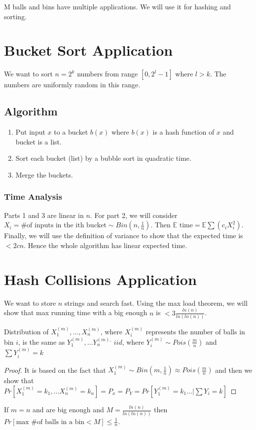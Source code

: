 M balls and bins have multiple applications. We will use it for hashing and sorting.

\section{Bucket Sort Application}

We want to sort $n = 2^k$ numbers from range $[0, 2^l-1]$ where $l > k$. The numbers are uniformly random in this range.

\subsection{Algorithm}

\begin{enumerate}
	\item Put input $x$ to a bucket $b(x)$ where $b(x)$ is a hash function of $x$ and bucket is a list.
	\item Sort each bucket (list) by a bubble sort in quadratic time.
	\item Merge the buckets.
\end{enumerate}

\subsubsection{Time Analysis}

Parts 1 and 3 are linear in $n$. For part 2, we will consider $X_i = \# \text{of inputs in the ith bucket} \sim Bin(n, \frac{1}{n})$. Then $\mathbb{E} \text{ time} = \mathbb{E} \sum (c_iX_i^2)$. Finally, we will use the definition of variance to show that the expected time is $ < 2cn$. Hence the whole algorithm has linear expected time.

\section{Hash Collisions Application}

We want to store $n$ strings and search fast. Using the max load theorem, we will show that max running time with a big enough $n$ is $< 3 \frac{ln(n)}{ln(ln(n))}$.

\begin{thm}
	Distribution of $X^{(m)}_{1}, \dots, X^{(m)}_n$, where $X_i^{(m)} $ represents the number of balls in bin $i$, is the same as $Y^{(m)}_1, \dots Y^{(m),}_n \ iid$, where $Y^{(m)}_i \sim Pois(\frac{m}{n})$ and $\sum Y_i^{(m)} = k$
\end{thm}

\begin{proof}
	It is based on the fact that $X^{(m)}_1 \sim Bin(m, \frac{1}{n}) \approx Pois(\frac{m}{n})$ and then we show that $Pr[X^{(m)}_1 = k_1, \dots X^{(m)}_n = k_n] = P_x = P_Y = Pr[Y^{(m)}_1 = k_1 \dots \vert \sum Y_i = k ]$
\end{proof}

\begin{thm}
	If $m=n$ and are big enough and $M = \frac{ln(n)}{ln(ln(n))}$ then $Pr[\text{max \# of balls in a bin} < M] \leq \frac{1}{n}$.
\end{thm}